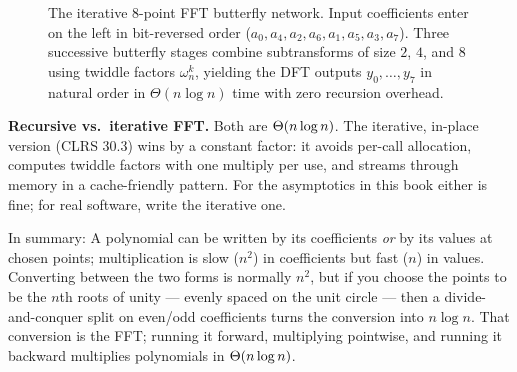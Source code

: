 \begin{figure}[H]
\caption{The iterative 8-point FFT butterfly network. Input coefficients enter on
the left in bit-reversed order ($a_0, a_4, a_2, a_6, a_1, a_5, a_3, a_7$). Three
successive butterfly stages combine subtransforms of size $2$, $4$, and $8$ using
twiddle factors $\omega_n^k$, yielding the DFT outputs $y_0,\dots,y_7$ in natural
order in $\Theta(n\log n)$ time with zero recursion overhead.}
\label{ch29:fig-butterfly-network}
\end{figure}

\begin{complexitybox}
\textbf{Recursive vs.\ iterative FFT.} Both are $\Theta(n\log n)$. The iterative,
in-place version (CLRS 30.3) wins by a constant factor: it avoids per-call
allocation, computes twiddle factors with one multiply per use, and streams through
memory in a cache-friendly pattern. For the asymptotics in this book either is fine;
for real software, write the iterative one.
\end{complexitybox}

\begin{recoverybox}
In summary: A polynomial can be
written by its coefficients \emph{or} by its values at chosen points; multiplication
is slow ($n^2$) in coefficients but fast ($n$) in values. Converting between the two
forms is normally $n^2$, but if you choose the points to be the $n$th roots of unity
--- evenly spaced on the unit circle --- then a divide-and-conquer split on even/odd
coefficients turns the conversion into $n\log n$. That conversion is the FFT; running
it forward, multiplying pointwise, and running it backward multiplies polynomials in
$\Theta(n\log n)$.
\end{recoverybox}

